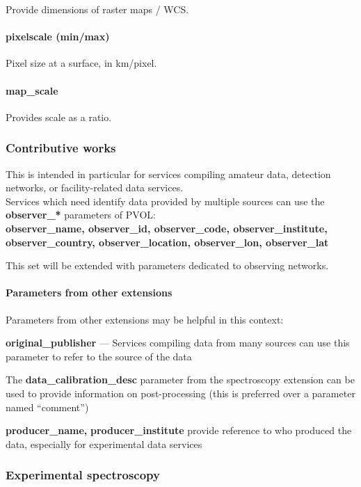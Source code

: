 \documentclass[11pt,a4paper]{ivoa}
\begin{document}
Provide dimensions of raster maps / WCS.

\paragraph{pixelscale (min/max)}

Pixel size at a surface, in km/pixel.

\paragraph{map\_scale}
Provides scale as a ratio.

\subsubsection{Contributive works}

This is intended in particular for services compiling amateur data,
detection networks, or facility-related data services.\\
Services which need identify data
provided by multiple sources can use the
\textbf{observer\_* }parameters of PVOL: \\
\textbf{observer\_name, observer\_id, observer\_code,
observer\_institute, observer\_country,
observer\_location, observer\_lon, observer\_lat}

This set will be extended with parameters dedicated to observing networks.

\paragraph{Parameters from other extensions}

Parameters from other extensions may be helpful in this context:

\textbf{original\_publisher} --- Services compiling data from many sources
can use this\textbf{ }parameter to refer to the source of the data

The\textbf{ \textbf{data\_calibration\_desc}} parameter from
the spectroscopy extension can be used to provide information on
post-processing (this is preferred over a parameter named ``comment'')

\textbf{producer\_name, }\textbf{producer\_institute }provide reference
to who produced the data, especially for experimental data services

\subsubsection{Experimental spectroscopy}
\end{document}
